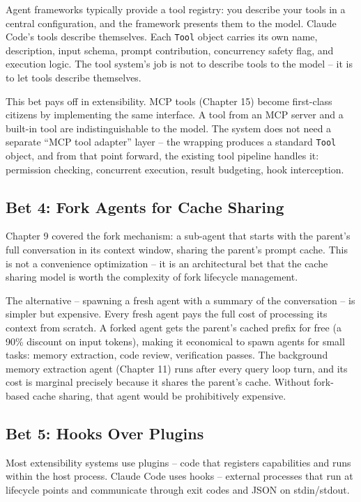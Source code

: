 \documentclass[
  english,
  11pt,
  letterpaper,
]{book}
\begin{document}
Agent frameworks typically provide a tool registry: you describe your
tools in a central configuration, and the framework presents them to the
model. Claude Code's tools describe themselves. Each \texttt{Tool}
object carries its own name, description, input schema, prompt
contribution, concurrency safety flag, and execution logic. The tool
system's job is not to describe tools to the model -- it is to let tools
describe themselves.

This bet pays off in extensibility. MCP tools (Chapter 15) become
first-class citizens by implementing the same interface. A tool from an
MCP server and a built-in tool are indistinguishable to the model. The
system does not need a separate ``MCP tool adapter'' layer -- the
wrapping produces a standard \texttt{Tool} object, and from that point
forward, the existing tool pipeline handles it: permission checking,
concurrent execution, result budgeting, hook interception.

\subsection{Bet 4: Fork Agents for Cache
Sharing}\label{bet-4-fork-agents-for-cache-sharing}

Chapter 9 covered the fork mechanism: a sub-agent that starts with the
parent's full conversation in its context window, sharing the parent's
prompt cache. This is not a convenience optimization -- it is an
architectural bet that the cache sharing model is worth the complexity
of fork lifecycle management.

The alternative -- spawning a fresh agent with a summary of the
conversation -- is simpler but expensive. Every fresh agent pays the
full cost of processing its context from scratch. A forked agent gets
the parent's cached prefix for free (a 90\% discount on input tokens),
making it economical to spawn agents for small tasks: memory extraction,
code review, verification passes. The background memory extraction agent
(Chapter 11) runs after every query loop turn, and its cost is marginal
precisely because it shares the parent's cache. Without fork-based cache
sharing, that agent would be prohibitively expensive.

\subsection{Bet 5: Hooks Over Plugins}\label{bet-5-hooks-over-plugins}

Most extensibility systems use plugins -- code that registers
capabilities and runs within the host process. Claude Code uses hooks --
external processes that run at lifecycle points and communicate through
exit codes and JSON on stdin/stdout.
\end{document}
